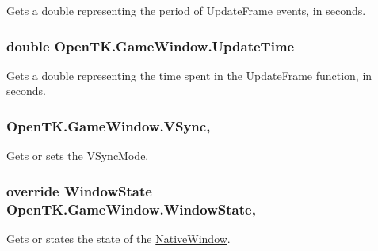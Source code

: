 Gets a double representing the period of Update\-Frame events, in seconds. 

\hypertarget{class_open_t_k_1_1_game_window_a324f362ab849612bb7a82ac84de92be0}{
\subsubsection[{Update\-Time}]{\setlength{\rightskip}{0pt plus 5cm}double Open\-T\-K.\-Game\-Window.\-Update\-Time\hspace{0.3cm}{\ttfamily [get]}}}\label{class_open_t_k_1_1_game_window_a324f362ab849612bb7a82ac84de92be0}


Gets a double representing the time spent in the Update\-Frame function, in seconds. 

\hypertarget{class_open_t_k_1_1_game_window_a13246c847d807cc510fd0fa8a58ae24b}{
\subsubsection[{V\-Sync}]{ Open\-T\-K.\-Game\-Window.\-V\-Sync\hspace{0.3cm}{\ttfamily [get]}, {\ttfamily [set]}}}\label{class_open_t_k_1_1_game_window_a13246c847d807cc510fd0fa8a58ae24b}


Gets or sets the V\-Sync\-Mode. 

\hypertarget{class_open_t_k_1_1_game_window_a2645b832f9583c904a9e0c83951ed9d4}{
\subsubsection[{Window\-State}]{\setlength{\rightskip}{0pt plus 5cm}override {\bf Window\-State} Open\-T\-K.\-Game\-Window.\-Window\-State\hspace{0.3cm}{\ttfamily [get]}, {\ttfamily [set]}}}\label{class_open_t_k_1_1_game_window_a2645b832f9583c904a9e0c83951ed9d4}


Gets or states the state of the \hyperlink{class_open_t_k_1_1_native_window}{Native\-Window}. 



